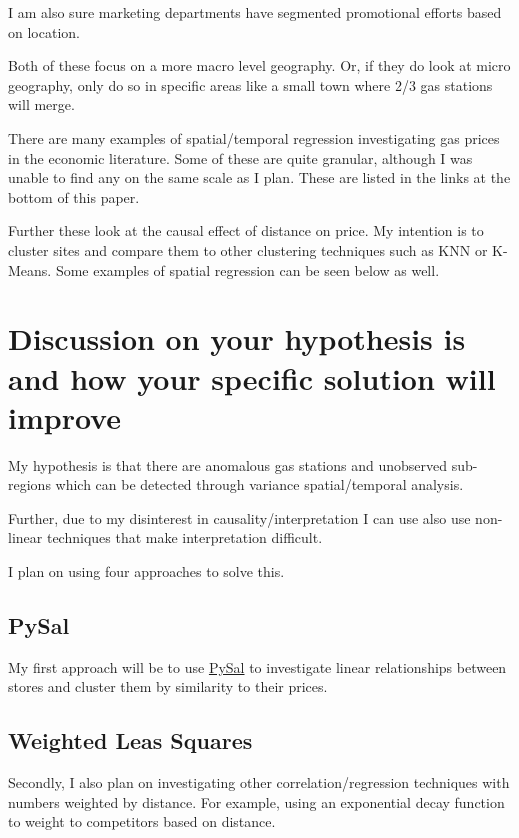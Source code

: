 \documentclass[11pt]{article}
\begin{document}
I am also sure marketing departments have segmented promotional efforts based on
location.

Both of these focus on a more macro level geography. Or, if they do look at
micro geography, only do so in specific areas like a small town where 2/3 gas
stations will merge.

There are many examples of spatial/temporal regression investigating gas prices
in the economic literature. Some of these are quite granular, although I was
unable to find any on the same scale as I plan. These are listed in the links
at the bottom of this paper.

Further these look at the causal effect of distance on price. My intention is to
cluster sites and compare them to other clustering techniques such as
KNN or K-Means. Some examples of spatial regression can be seen below as well.


\section{Discussion on your hypothesis is and how your specific solution will improve}
\label{sec:orgb20edd6}

My hypothesis is that there are anomalous gas stations and unobserved
sub-regions which can be detected through variance spatial/temporal analysis.

Further, due to my disinterest in causality/interpretation I can use also use
non-linear techniques that make interpretation difficult.

I plan on using four approaches to solve this. 

\subsection{PySal}
\label{sec:orgcff813b}
My first approach will be to use \href{https://www.earthdatascience.org/tutorials/intro-to-spatial-regression/}{PySal} to investigate linear relationships
between stores and cluster them by similarity to their prices.

\subsection{Weighted Leas Squares}
\label{sec:orgf14c874}
Secondly, I also plan on investigating other correlation/regression techniques with
numbers weighted by distance. For example, using an exponential decay function
to weight to competitors based on distance.
\end{document}
